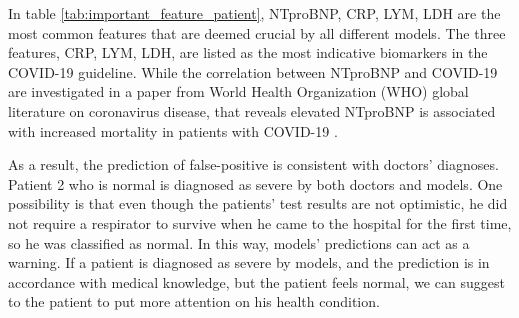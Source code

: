 




In table \ref{tab:important_feature_patient}, NTproBNP, CRP, LYM, LDH are the most common features that are deemed crucial by all different models. The three features, CRP, LYM, LDH, are listed as the most indicative biomarkers in the COVID-19 guideline. While the correlation between NTproBNP and COVID-19 are investigated in a paper from World Health Organization (WHO) global literature on coronavirus disease, that reveals elevated NTproBNP is associated with increased mortality in patients with COVID-19 \citep{Pranata387}.

As a result, the prediction of false-positive is consistent with doctors' diagnoses. Patient 2 who is normal is diagnosed as severe by both doctors and models. One possibility is that even though the patients' test results are not optimistic, he did not require a respirator to survive when he came to the hospital for the first time, so he was classified as normal. In this way, models' predictions can act as a warning. If a patient is diagnosed as severe by models, and the prediction is in accordance with medical knowledge, but the patient feels normal, we can suggest to the patient to put more attention on his health condition.

